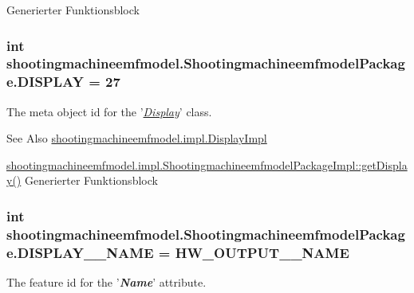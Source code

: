 Generierter Funktionsblock  \hypertarget{interfaceshootingmachineemfmodel_1_1_shootingmachineemfmodel_package_a5192d9d2f65949d1265252867e80bb70}{
\subsubsection[{D\-I\-S\-P\-L\-A\-Y}]{\setlength{\rightskip}{0pt plus 5cm}int shootingmachineemfmodel.\-Shootingmachineemfmodel\-Package.\-D\-I\-S\-P\-L\-A\-Y = 27}}\label{interfaceshootingmachineemfmodel_1_1_shootingmachineemfmodel_package_a5192d9d2f65949d1265252867e80bb70}
The meta object id for the '\hyperlink{classshootingmachineemfmodel_1_1impl_1_1_display_impl}{{\itshape Display}}' class.

\begin{DoxySeeAlso}{See Also}
\hyperlink{classshootingmachineemfmodel_1_1impl_1_1_display_impl}{shootingmachineemfmodel.\-impl.\-Display\-Impl} 

\hyperlink{classshootingmachineemfmodel_1_1impl_1_1_shootingmachineemfmodel_package_impl_aeb5fff339c8b842a0d511fa06ca98023}{shootingmachineemfmodel.\-impl.\-Shootingmachineemfmodel\-Package\-Impl\-::get\-Display()} Generierter Funktionsblock 
\end{DoxySeeAlso}
\hypertarget{interfaceshootingmachineemfmodel_1_1_shootingmachineemfmodel_package_a285c9b72184c985918ffefe121eabcd9}{
\subsubsection[{D\-I\-S\-P\-L\-A\-Y\-\_\-\-\_\-\-N\-A\-M\-E}]{\setlength{\rightskip}{0pt plus 5cm}int shootingmachineemfmodel.\-Shootingmachineemfmodel\-Package.\-D\-I\-S\-P\-L\-A\-Y\-\_\-\-\_\-\-N\-A\-M\-E = {\bf H\-W\-\_\-\-O\-U\-T\-P\-U\-T\-\_\-\-\_\-\-N\-A\-M\-E}}}\label{interfaceshootingmachineemfmodel_1_1_shootingmachineemfmodel_package_a285c9b72184c985918ffefe121eabcd9}
The feature id for the '{\itshape {\bfseries Name}}' attribute.

